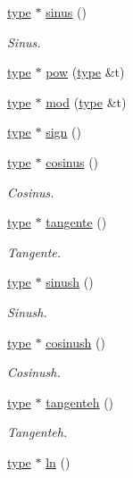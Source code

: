 \begin{DoxyCompactItemize}
\hyperlink{classtype}{type} $\ast$ \hyperlink{classreel_a8436fd89eda982a6b023e2f7081b5cb0}{sinus} ()
\begin{DoxyCompactList}\small\item\em Sinus. \end{DoxyCompactList}\item 
\hyperlink{classtype}{type} $\ast$ \hyperlink{classreel_a4fdea6a69bd78b2593fb44cc172fc7bf}{pow} (\hyperlink{classtype}{type} \&t)
\item 
\hyperlink{classtype}{type} $\ast$ \hyperlink{classreel_a7bf66e936c424f243a534406dbe8e8d7}{mod} (\hyperlink{classtype}{type} \&t)
\item 
\hyperlink{classtype}{type} $\ast$ \hyperlink{classreel_a9a172c44e0a496059bdd1c4d53a98590}{sign} ()
\item 
\hyperlink{classtype}{type} $\ast$ \hyperlink{classreel_a4d1fb90011705658295e922d525a91dd}{cosinus} ()
\begin{DoxyCompactList}\small\item\em Cosinus. \end{DoxyCompactList}\item 
\hyperlink{classtype}{type} $\ast$ \hyperlink{classreel_a8ded2c9525ab4937f20b28d31a381442}{tangente} ()
\begin{DoxyCompactList}\small\item\em Tangente. \end{DoxyCompactList}\item 
\hyperlink{classtype}{type} $\ast$ \hyperlink{classreel_ad404481ff6381767546b93ca0c4ba3e3}{sinush} ()
\begin{DoxyCompactList}\small\item\em Sinush. \end{DoxyCompactList}\item 
\hyperlink{classtype}{type} $\ast$ \hyperlink{classreel_ad2d6ed0dcaa8fa7b410ca1a84c0d3f57}{cosinush} ()
\begin{DoxyCompactList}\small\item\em Cosinush. \end{DoxyCompactList}\item 
\hyperlink{classtype}{type} $\ast$ \hyperlink{classreel_a4d66c94b0c33019d0dfae8deb2bb41a3}{tangenteh} ()
\begin{DoxyCompactList}\small\item\em Tangenteh. \end{DoxyCompactList}\item 
\hyperlink{classtype}{type} $\ast$ \hyperlink{classreel_a5d09de0b7e0856eb63d333f766c770ed}{ln} ()

\end{DoxyCompactItemize}
